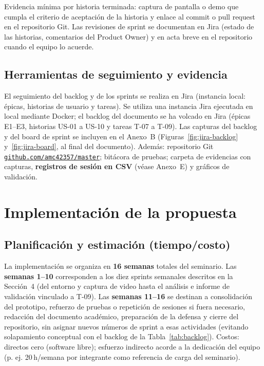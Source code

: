 \documentclass[11pt,a4paper]{article}
\begin{document}
Evidencia mínima por historia terminada: captura de pantalla o demo que cumpla el criterio de aceptación de la historia y enlace al commit o pull request en el repositorio Git. Las revisiones de sprint se documentan en Jira (estado de las historias, comentarios del Product Owner) y en acta breve en el repositorio cuando el equipo lo acuerde.

\subsection{Herramientas de seguimiento y evidencia}
El seguimiento del backlog y de los sprints se realiza en Jira (instancia local: épicas, historias de usuario y tareas). Se utiliza una instancia Jira ejecutada en local mediante Docker; el backlog del documento se ha volcado en Jira (épicas E1--E3, historias US-01 a US-10 y tareas T-07 a T-09). Las capturas del backlog y del board de sprint se incluyen en el Anexo~B (Figuras~\ref{fig:jira-backlog} y~\ref{fig:jira-board}, al final del documento). Además: repositorio Git \href{https://github.com/amc42357/master}{\texttt{github.com/amc42357/master}}; bitácora de pruebas; carpeta de evidencias con capturas, \textbf{registros de sesión en CSV} (véase Anexo~E) y gráficos de validación.

\clearpage
{}
\section{Implementación de la propuesta}

\subsection{Planificación y estimación (tiempo/costo)}
La implementación se organiza en \textbf{16 semanas} totales del seminario. Las \textbf{semanas 1--10} corresponden a los diez sprints semanales descritos en la Sección~4 (del entorno y captura de video hasta el análisis e informe de validación vinculado a T-09). Las \textbf{semanas 11--16} se destinan a consolidación del prototipo, refuerzo de pruebas o repetición de sesiones si fuera necesario, redacción del documento académico, preparación de la defensa y cierre del repositorio, sin asignar nuevos números de sprint a esas actividades (evitando solapamiento conceptual con el backlog de la Tabla~\ref{tab:backlog}). Costos: directos cero (software libre); esfuerzo indirecto acorde a la dedicación del equipo (p. ej. 20\,h/semana por integrante como referencia de carga del seminario).
\end{document}
